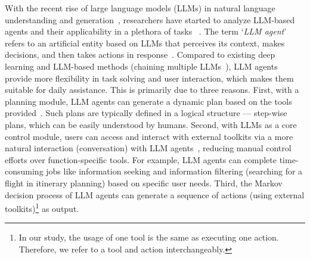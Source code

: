 With the recent rise of large language models (LLMs) in natural language understanding and generation~\cite{zhao2023survey}, researchers have started to analyze LLM-based agents and their applicability in a plethora of tasks %
~\cite{xi2023rise,wang2024survey}. 
The term `\textit{LLM agent}' refers to an artificial entity based on LLMs that perceives its context, makes decisions, and then takes actions in response~\cite{xi2023rise}.
Compared to existing deep learning and LLM-based methods (\eg chaining multiple LLMs~\cite{wu2022ai}), LLM agents provide more flexibility in task solving and user interaction, which makes them suitable for daily assistance. This is primarily due to three reasons.
First, with a planning module, LLM agents can generate a dynamic plan based on the tools provided~\cite{xi2023rise,wang2024survey}. 
Such plans are typically defined in a logical structure --- step-wise plans, which can be easily understood by humans. 
Second, with LLMs as a core control module, users can access and interact with external toolkits via a more natural interaction (\ie conversation) with LLM agents~\cite{bommasani2021opportunities,zhao2023survey}, reducing manual control efforts over function-specific tools. 
For example, LLM agents can complete time-consuming jobs like information seeking and information filtering (\eg searching for a flight in itinerary planning) based on specific user needs. 
Third, the Markov decision process of LLM agents can generate a sequence of actions (\ie using external toolkits)\footnote{In our study, the usage of one tool is the same as executing one action. Therefore, we refer to a tool and action interchangeably.} as output. 
